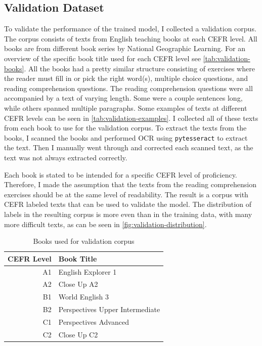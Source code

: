 \documentclass[11pt,a4paper]{article}
\begin{document}
\subsection{Validation Dataset}

To validate the performance of the trained model, I collected a
validation corpus. The corpus consists of texts from English teaching books at each CEFR level.
All books are from different book series by National Geographic Learning.
For an overview of the specific book title used for each CEFR level see
\autoref{tab:validation-books}. All the books had a pretty similar structure
consisting of exercises where the reader must fill in or pick the right
word(s), multiple choice questions, and reading comprehension questions. The
reading comprehension questions were all accompanied by a text of varying
length. Some were a couple sentences long, while others spanned multiple
paragraphs. Some examples of texts at different CEFR levels can be seen in
\autoref{tab:validation-examples}. I collected all of these texts from each book to use for the
validation corpus. To extract the texts from the books, I scanned the books and
performed OCR using \verb!pytesseract! to
extract the text. Then I manually went through and corrected each scanned text,
as the text was not always extracted correctly.

Each book is stated to be intended for a specific CEFR level of proficiency.
Therefore, I made the assumption that the texts from the reading comprehension exercises
should be at the same level of readability. The
result is a corpus with CEFR labeled texts that can be used to validate the
model. The distribution of labels in the resulting corpus is more even than in
the training data, with many more difficult texts, as can be seen in
\autoref{fig:validation-distribution}.

\begin{table}
  \centering
  \begin{tabular}{r|l}
    \toprule
    CEFR Level & Book Title\\
    \midrule
    A1 & English Explorer 1\\
    A2 & Close Up A2\\
    B1 & World English 3\\
    B2 & Perspectives Upper Intermediate\\
    C1 & Perspectives Advanced\\
    C2 & Close Up C2\\
    \bottomrule
  \end{tabular}
  \caption{Books used for validation corpus}
  \label{tab:validation-books}
\end{table}
\end{document}
